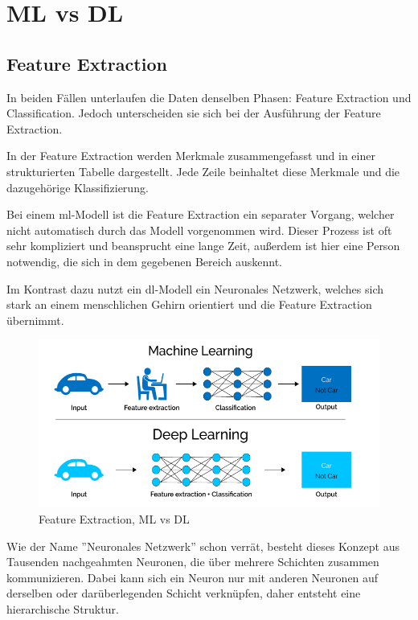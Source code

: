 \section{ML vs DL}

\subsection{Feature Extraction}

In beiden Fällen unterlaufen die Daten denselben Phasen: Feature Extraction und Classification. Jedoch unterscheiden sie sich bei der Ausführung der Feature Extraction.

In der Feature Extraction werden Merkmale zusammengefasst und in einer strukturierten Tabelle dargestellt. Jede Zeile beinhaltet diese Merkmale und die dazugehörige Klassifizierung.

Bei einem \gls{ml}-Modell ist die Feature Extraction ein separater Vorgang, welcher nicht automatisch durch das Modell vorgenommen wird. Dieser Prozess ist oft sehr kompliziert und beansprucht eine lange Zeit, außerdem ist hier eine Person notwendig, die sich in dem gegebenen Bereich auskennt.

Im Kontrast dazu nutzt ein \gls{dl}-Modell ein Neuronales Netzwerk, welches sich stark an einem menschlichen Gehirn orientiert und die Feature Extraction übernimmt.

\begin{figure}[H]
    \centering
    \includegraphics[scale=0.6]{sections/machine-learning/images/MLvsDL.png}
    \caption{Feature Extraction, ML vs DL}
\end{figure}

Wie der Name ''Neuronales Netzwerk'' schon verrät, besteht dieses Konzept aus Tausenden nachgeahmten Neuronen, die über mehrere Schichten zusammen kommunizieren. Dabei kann sich ein Neuron nur mit anderen Neuronen auf derselben oder darüberlegenden Schicht verknüpfen, daher entsteht eine hierarchische Struktur.

